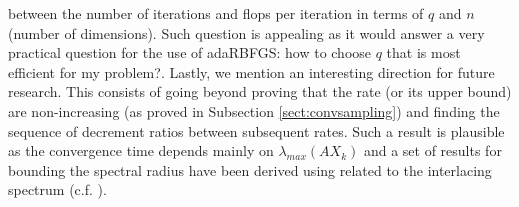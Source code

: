 \documentclass[12pt,conference,compsocconf]{IEEEtran}
\begin{document}
between the number of iterations and flops per iteration in terms of $q$ and $n$ (number of dimensions). Such question is appealing as it would answer a very practical question for the use of adaRBFGS: how to choose $q$ that is most efficient for my problem?. Lastly, we mention an interesting direction for future research. This consists of going beyond proving that the rate (or its upper bound) are non-increasing (as proved in Subsection \ref{sect:convsampling}) and finding the sequence of decrement ratios between subsequent rates. Such a result is plausible as the convergence time depends mainly on $\lambda_{max}(AX_k)$ and a set of results for bounding the spectral radius have been derived using related to the interlacing spectrum (c.f. \cite{Mercer,Horne}).




%
\end{document}
